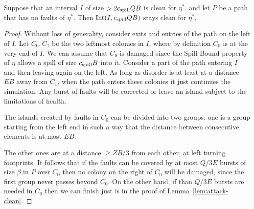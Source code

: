 \documentclass[11pt]{memoir}
\theoremstyle{definition} %
\renewcommand{\ge}{\geq}
\def\B{B}
\newcommand{\E}{E} %
\newcommand{\Int}{\mathrm{Int}} %
\newcommand{\Q}{Q} %
\newcommand{\Z}{Z} %
\newcommand{\cns}[1]{c_{\textrm{\upshape #1}}}
\newcommand{\CSpill}{\cns{spill}}
\begin{document}
\begin{lemma}\label{lem:spill-bound}
Suppose that an interval \( I \) of size \( > 2\CSpill\Q\B \) is clean for \( \eta^{*} \). and
let \( P \) be a path that has no faults of \( \eta^{*} \).
Then \( \Int(I,\CSpill\Q\B) \) stays clean for \( \eta^{*} \).
\end{lemma}
\begin{proof}
  Without loss of generality, consider exits and entries of the path on the left of \( I \).
  Let \( C_{0},C_{1}\) be the two leftmost colonies in \( I \), where
  by definition \( C_{0} \) is at the very end of \( I \).
  We can assume that \( C_{0} \) 
  is damaged since the Spill Bound property of \( \eta \) allows a spill of size \( \CSpill\B \) into it.
  Consider a part of the path entering \( I \) and then leaving again on the left.
  As long as disorder is at least at a distance \( \E\B \) away from \( C_{1} \),
  when the path enters these colonies it just continues the simulation.
  Any burst of faults will be corrected or leave an island subject to the limitations of health.

  The islands created by faults in \( C_{0} \) can be divided into two groups: one is a group 
  starting from the left end in such a way that the distance between consecutive elements
  is at most \( \E\B \).
  
  The other ones are at a distance \( \ge\Z\B/3 \) from each other, at left turning footprints.
  It follows that if the faults can be covered by at most \( \Q/3\E \) bursts of size \( \beta \)
  in \( P \) over \( C_{0} \) then no colony on the right of \( C_{0} \)
  will be damaged, since the first group never passes beyond \( C_{0} \).
  On the other hand, if  than \( \Q/3\E \) bursts are needed in \( C_{0} \)
  then we can finish just is in the proof of Lemma~\ref{lem:attack-clean}.
\end{proof}


\end{document}
